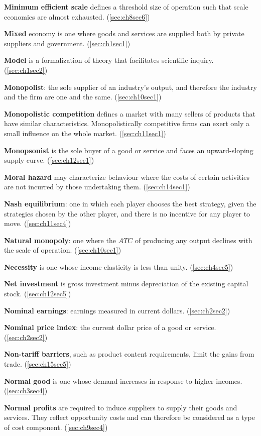\textbf{Minimum efficient scale} defines a threshold size of operation such that scale economies are almost exhausted. (\ref{sec:ch8sec6})

\textbf{Mixed} economy is one where goods and services are supplied both by private suppliers and government. (\ref{sec:ch1sec1})

\textbf{Model} is a formalization of theory that facilitates scientific inquiry. (\ref{sec:ch1sec2})

\textbf{Monopolist}: the sole supplier of an industry's output, and therefore the industry and the firm are one and the same. (\ref{sec:ch10sec1})

\textbf{Monopolistic competition} defines a market with many sellers of products that have similar characteristics. Monopolistically competitive firms can exert only a small influence on the whole market. (\ref{sec:ch11sec1})

\textbf{Monopsonist} is the sole buyer of a good or service and faces an upward-sloping supply curve. (\ref{sec:ch12sec1})

\textbf{Moral hazard} may characterize behaviour where the costs of certain activities are not incurred by those undertaking them. (\ref{sec:ch14sec1})

\textbf{Nash equilibrium}: one in which each player chooses the best strategy, given the strategies chosen by the other player, and there is no incentive for any player to move. (\ref{sec:ch11sec4})

\textbf{Natural monopoly}: one where the $ATC$ of producing any output declines with the scale of operation. (\ref{sec:ch10sec1})

\textbf{Necessity} is one whose income elasticity is less than unity. (\ref{sec:ch4sec5})

\textbf{Net investment} is gross investment minus depreciation of the existing capital stock. (\ref{sec:ch12sec5})

\textbf{Nominal earnings}: earnings measured in current dollars. (\ref{sec:ch2sec2})

\textbf{Nominal price index}: the current dollar price of a good or service. (\ref{sec:ch2sec2})

\textbf{Non-tariff barriers}, such as product content requirements, limit the gains from trade. (\ref{sec:ch15sec5})

\textbf{Normal good} is one whose demand increases in response to higher incomes. (\ref{sec:ch3sec4})

\textbf{Normal profits} are required to induce suppliers to supply their goods and services. They reflect opportunity costs and can therefore be considered as a type of cost component. (\ref{sec:ch9sec4})

